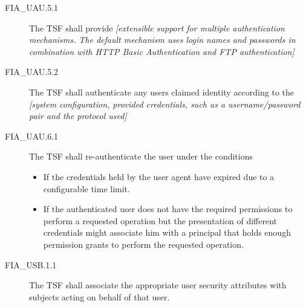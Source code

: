 \documentclass[12pt,english]{scrbook}
\begin{document}
\begin{description}
\item[FIA{\_}UAU.5.1 ]

The TSF shall provide \emph{{[}extensible support for multiple
authentication mechanisms. The default mechanism uses login names
and passwords in combination with HTTP Basic Authentication and FTP
authentication]}

\item[FIA{\_}UAU.5.2]

The TSF shall authenticate any users claimed identity according to
the \emph{{[}system configuration, provided credentials, such as a
username/password pair and the protocol used]}

\end{description}





\begin{description}
\item[FIA{\_}UAU.6.1 ]

The TSF shall re-authenticate the user under the conditions
\begin{itemize}
\item {} 
If the credentials held by the user agent have expired due to
a configurable time limit.

\item {} 
If the authenticated user does not have the required permissions to
perform a requested operation but the presentation of different
credentials might associate him with a principal that holds enough
permission grants to perform the requested operation.

\end{itemize}

\end{description}





\begin{description}
\item[FIA{\_}USB.1.1]

The TSF shall associate the appropriate user security
attributes with subjects acting on behalf of that user.

\end{description}
\end{document}
